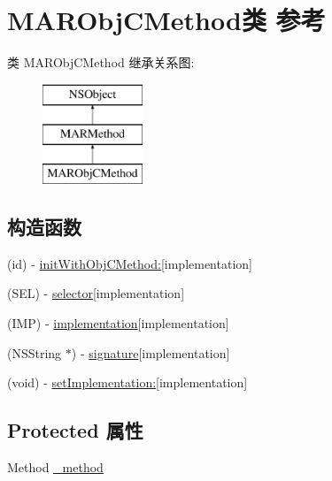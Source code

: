 \hypertarget{interface_m_a_r_obj_c_method}{}\section{M\+A\+R\+Obj\+C\+Method类 参考}
\label{interface_m_a_r_obj_c_method}
类 M\+A\+R\+Obj\+C\+Method 继承关系图\+:\begin{figure}[H]
\begin{center}
\leavevmode
\includegraphics[height=3.000000cm]{interface_m_a_r_obj_c_method}
\end{center}
\end{figure}
\subsection*{构造函数}
\begin{DoxyCompactItemize}
\item 
(id) -\/ \hyperlink{interface_m_a_r_obj_c_method_aa5fcc429f5cec4d0b9af5276ffdac7fc}{init\+With\+Obj\+C\+Method\+:}{\ttfamily  \mbox{[}implementation\mbox{]}}
\item 
(S\+EL) -\/ \hyperlink{interface_m_a_r_obj_c_method_ad43e6578ecf2f57ad35fea72ce6d9f7e}{selector}{\ttfamily  \mbox{[}implementation\mbox{]}}
\item 
(I\+MP) -\/ \hyperlink{interface_m_a_r_obj_c_method_af57e7f0e2f9a6fee8f2e5d3e279c8ab7}{implementation}{\ttfamily  \mbox{[}implementation\mbox{]}}
\item 
(N\+S\+String $\ast$) -\/ \hyperlink{interface_m_a_r_obj_c_method_a2c706d26be0104fb5c705f2e30b2c7c4}{signature}{\ttfamily  \mbox{[}implementation\mbox{]}}
\item 
(void) -\/ \hyperlink{interface_m_a_r_obj_c_method_a42623f6469580543e5606a1a73bbb22d}{set\+Implementation\+:}{\ttfamily  \mbox{[}implementation\mbox{]}}
\end{DoxyCompactItemize}
\subsection*{Protected 属性}
\begin{DoxyCompactItemize}
\item 
Method \hyperlink{interface_m_a_r_obj_c_method_aa1094dc567c58d50656b418cbd5c71d6}{\+\_\+method}
\end{DoxyCompactItemize}
